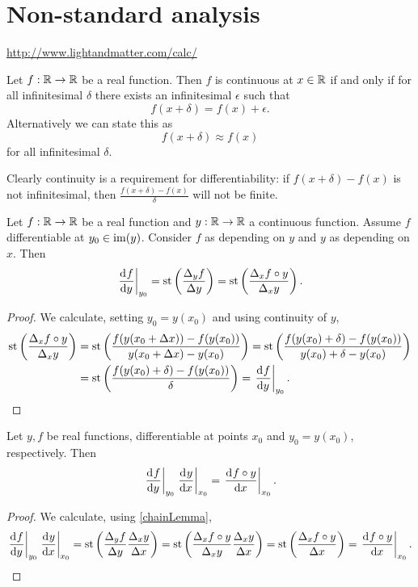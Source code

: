\chapter{Non-standard analysis}
\url{http://www.lightandmatter.com/calc/}

\begin{proposition}
Let $f:\mathbb{R}\to\mathbb{R}$ be a real function. Then $f$ is continuous at $x\in\mathbb{R}$ \textup{if and only if} for all infinitesimal $\delta$ there exists an infinitesimal $\epsilon$ such that
\[ f(x+\delta) = f(x) + \epsilon. \]
Alternatively we can state this as
\[ f(x+\delta) \approx f(x) \]
for all infinitesimal $\delta$.
\end{proposition}

Clearly continuity is a requirement for differentiability: if $f(x+\delta) - f(x)$ is not infinitesimal, then $\frac{f(x+\delta) - f(x)}{\delta}$ will not be finite.

\begin{lemma} \label{chainLemma}
Let $f:\mathbb{R}\to\mathbb{R}$ be a real function and $y:\mathbb{R}\to\mathbb{R}$ a continuous function. Assume $f$ differentiable at $y_0\in\operatorname{im}(y)$. Consider $f$ as depending on $y$ and $y$ as depending on $x$. Then
\[ \left.\mathinner{ \dfrac{\operatorname{d \!}{^{}}f}{\operatorname{d \!}{{y}^{}}} }\right|_{y_0} = \operatorname{st}\left(\frac{\Delta_y f}{\Delta y}\right) = \operatorname{st}\left(\frac{\Delta_x f\circ y}{\Delta_x y}\right). \]
\end{lemma}
\begin{proof}
We calculate, setting $y_0 = y(x_0)$ and using continuity of $y$,
\begin{align*}
\operatorname{st}\left(\frac{\Delta_x f\circ y}{\Delta_x y}\right) &= \operatorname{st}\left(\frac{f(y(x_0+\Delta x)) -f(y(x_0))}{y(x_0+\Delta x) - y(x_0)}\right) = \operatorname{st}\left(\frac{f(y(x_0)+\delta) -f(y(x_0))}{y(x_0)+\delta - y(x_0)}\right) \\
&= \operatorname{st}\left(\frac{f(y(x_0)+\delta) -f(y(x_0))}{\delta}\right) = \left.\mathinner{ \dfrac{\operatorname{d \!}{^{}}f}{\operatorname{d \!}{{y}^{}}} }\right|_{y_0}.
\end{align*}
\end{proof}

\begin{proposition}
Let $y,f$ be real functions, differentiable at points $x_0$ and $y_0=y(x_0)$, respectively. Then
\[ \left.\mathinner{ \dfrac{\operatorname{d \!}{^{}}f}{\operatorname{d \!}{{y}^{}}} }\right|_{y_0} \left.\mathinner{ \dfrac{\operatorname{d \!}{^{}}y}{\operatorname{d \!}{{x}^{}}} }\right|_{x_0} = \left.\mathinner{ \dfrac{\operatorname{d \!}{^{}}f\circ y}{\operatorname{d \!}{{x}^{}}} }\right|_{x_0}. \]
\end{proposition}
\begin{proof}
We calculate, using \ref{chainLemma},
\[ \left.\mathinner{ \dfrac{\operatorname{d \!}{^{}}f}{\operatorname{d \!}{{y}^{}}} }\right|_{y_0} \left.\mathinner{ \dfrac{\operatorname{d \!}{^{}}y}{\operatorname{d \!}{{x}^{}}} }\right|_{x_0} = \operatorname{st}\left(\frac{\Delta_y f}{\Delta y}\frac{\Delta_x y}{\Delta x}\right) = \operatorname{st}\left(\frac{\Delta_x f\circ y}{\Delta_x y}\frac{\Delta_x y}{\Delta x}\right) = \operatorname{st}\left(\frac{\Delta_x f\circ y}{\Delta x}\right) = \left.\mathinner{ \dfrac{\operatorname{d \!}{^{}}f\circ y}{\operatorname{d \!}{{x}^{}}} }\right|_{x_0}. \]
\end{proof}

